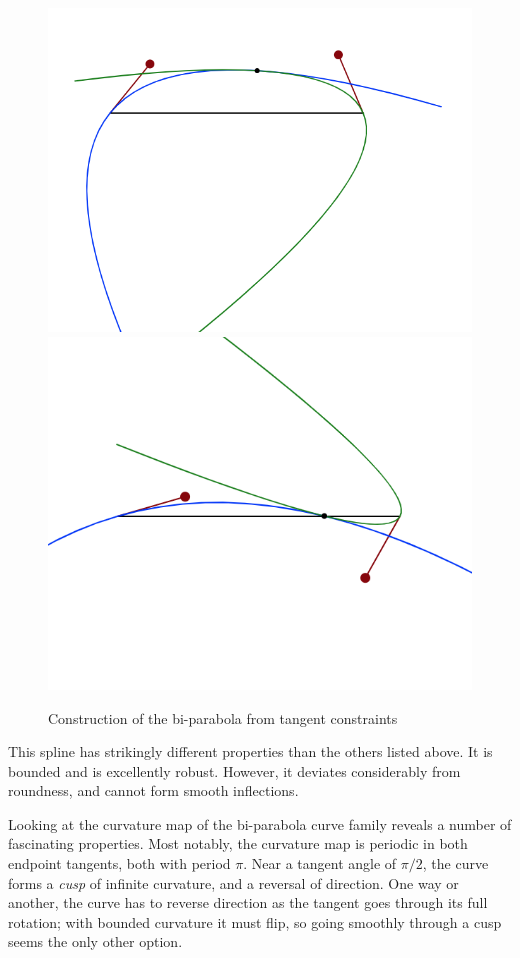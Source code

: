 \documentclass{article}
\begin{document}
\begin{figure}
\centering
\includegraphics[scale=0.5]{biparabola}
\includegraphics[scale=0.5]{biparabola2}
\caption{Construction of the bi-parabola from tangent constraints}
\label{biparabola}
\end{figure}


This spline has strikingly different properties than the others listed above. It is bounded and is excellently robust. However, it deviates considerably from roundness, and cannot form smooth inflections.

Looking at the curvature map of the bi-parabola curve family reveals a number of fascinating properties. Most notably, the curvature map is periodic in both endpoint tangents, both with period $\pi$. Near a tangent angle of $\pi/2$, the curve forms a \emph{cusp} of infinite curvature, and a reversal of direction. One way or another, the curve has to reverse direction as the tangent goes through its full rotation; with bounded curvature it must flip, so going smoothly through a cusp seems the only other option.
\end{document}
